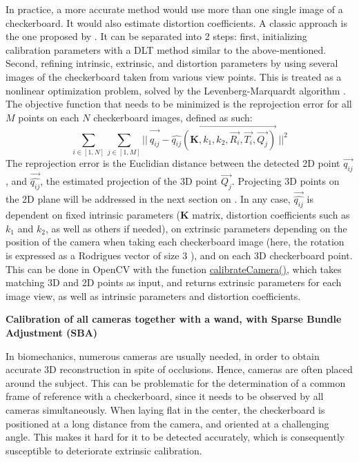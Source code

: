 In practice, a more accurate method would use more than one single image of a checkerboard. It would also estimate distortion coefficients. A classic approach is the one proposed by \cite{Zhang2000}. It can be separated into 2 steps: first, initializing calibration parameters with a DLT method similar to the above-mentioned. Second, refining intrinsic, extrinsic, and distortion parameters by using several images of the checkerboard taken from various view points. This is treated as a nonlinear optimization problem, solved by the Levenberg-Marquardt algorithm \cite{Marquardt1963,More1978}. The objective function that needs to be minimized is the reprojection error for all $M$ points on each $N$ checkerboard images, defined as such:
\begin{equation}\label{eq:LM_algo}
  \sum_{i \in [1,N]} \sum_{j \in [1,M]} 
  ||\ \overrightarrow{q_{ij}^{\ ^{\ ^{\ ^{\ }}}}} -
  \overrightarrow{\widehat{q_{ij}}(\textbf{K},k_1,k_2,\overrightarrow{R_i},\overrightarrow{T_i},\overrightarrow{Q_j})}\ 
  ||^2
\end{equation} 
The reprojection error is the Euclidian distance between the detected 2D point $\overrightarrow{q_{ij}}$, and $\overrightarrow{\widehat{q_{ij}}}$, the estimated projection of the 3D point $\overrightarrow{Q_j}$. Projecting 3D points on the 2D plane will be addressed in the next section on . In any case, $\overrightarrow{\widehat{q_{ij}}}$ is dependent on fixed intrinsic parameters (\textbf{K} matrix, distortion coefficients such as $k_1$ and $k_2$, as well as others if needed), on extrinsic parameters depending on the position of the camera when taking each checkerboard image (here, the rotation is expressed as a Rodrigues vector of size 3 \cite{Gallego2015}), and on each 3D checkerboard point. This can be done in OpenCV with the function \href{https://docs.opencv.org/4.x/d9/d0c/group__calib3d.html#ga3207604e4b1a1758aa66acb6ed5aa65d}{calibrateCamera()}, which takes matching 3D and 2D points as input, and returns extrinsic parameters for each image view, as well as intrinsic parameters and distortion coefficients.

\vspace*{0.5cm}
\noindent\textbf{Calibration of all cameras together with a wand, with Sparse Bundle Adjustment (SBA)} 

In biomechanics, numerous cameras are usually needed, in order to obtain accurate 3D reconstruction in spite of occlusions. Hence, cameras are often placed around the subject. This can be problematic for the determination of a common frame of reference with a checkerboard, since it needs to be observed by all cameras simultaneously. When laying flat in the center, the checkerboard is positioned at a long distance from the camera, and oriented at a challenging angle. This makes it hard for it to be detected accurately, which is consequently susceptible to deteriorate extrinsic calibration. 

